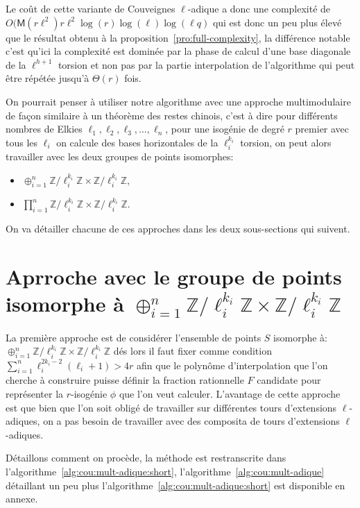 \documentclass[10pt,a4paper]{book}
\theoremstyle{plain}
\theoremstyle{definition}
\theoremstyle{definition}
\theoremstyle{definition}
\theoremstyle{definition}
\theoremstyle{remark}
\theoremstyle{remark}
\theoremstyle{definition}
\begin{document}
Le coût de cette variante de Couveignes $\ell$-adique a donc une complexité de
$O(\mathsf{M}(r\ell^2)r\ell^2 \log(r) \log(\ell) \log(\ell q)$ qui est donc un 
peu plus élevé que le résultat obtenu à la 
proposition~\ref{pro:full-complexity}, la différence notable c'est qu'ici la 
complexité est dominée par la phase de calcul d'une base diagonale de la 
$\ell^{h+1}$ torsion et non pas par la partie interpolation de l'algorithme qui
peut être répétée jusqu'à $\Theta(r)$ fois.


On pourrait penser à utiliser notre algorithme avec une approche multimodulaire
de façon similaire à un théorème des restes chinois, c'est à dire pour 
différents nombres de Elkies $\ell_1, \ell_2, \ell_3, \dots, \ell_{n}$, pour 
une isogénie de degré $r$ premier avec tous les $\ell_i$ on calcule des bases 
horizontales de la $\ell_i^{k_i}$ torsion, on peut alors travailler avec les 
deux groupes de points isomorphes:
\begin{itemize}
\item $\oplus_{i=1}^n \mathbb{Z}/\ell_i^{k_i} \mathbb{Z} \times \mathbb{Z}/\ell_i^{k_i} \mathbb{Z}$, 
\item $\prod_{i=1}^n \mathbb{Z}/\ell_i^{k_i} \mathbb{Z} \times \mathbb{Z}/\ell_i^{k_i} \mathbb{Z} $.
\end{itemize}
On va détailler chacune de ces approches dans les deux sous-sections qui suivent.

\section{Aprroche avec le groupe de points isomorphe à $\oplus_{i=1}^n \mathbb{Z}/\ell_i^{k_i} \mathbb{Z} \times \mathbb{Z}/\ell_i^{k_i} \mathbb{Z}$}
La première approche est de considérer l'ensemble de points $S$ isomorphe à: 
$\oplus_{i=1}^n \mathbb{Z}/\ell_i^{k_i} \mathbb{Z} \times \mathbb{Z}/\ell_i^{k_i} \mathbb{Z} $
dés lors il faut fixer comme condition  $\sum_{i=1}^n\ell_i^{2k_{i}-2}(\ell_i+1)>4r$
afin que le polynôme d'interpolation que l'on cherche à construire puisse 
définir la fraction rationnelle $F$ candidate pour représenter la $r$-isogénie 
$\phi$ que l'on veut calculer. 
L'avantage de cette approche est que bien que l'on soit obligé de travailler
sur différentes tours d'extensions $\ell$-adiques, on a pas besoin de 
travailler avec des composita de tours d'extensions $\ell$-adiques.

Détaillons comment on procède, la méthode est restranscrite dans 
l'algorithme~\ref{alg:cou:mult-adique:short}, 
l'algorithme~\ref{alg:cou:mult-adique} détaillant un peu plus 
l'algorithme~\ref{alg:cou:mult-adique:short} est disponible en annexe.
\end{document}

